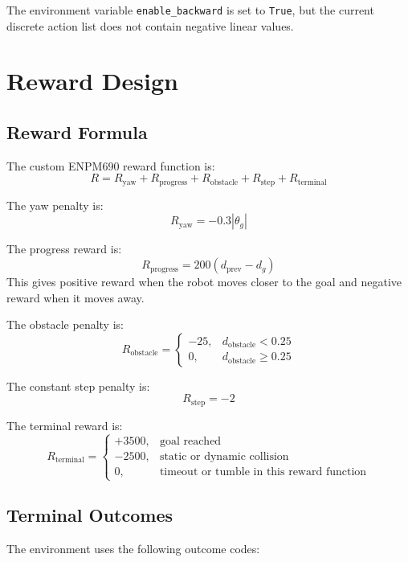 \documentclass[11pt,a4paper]{article}
\begin{document}
The environment variable \texttt{enable\_backward} is set to \texttt{True}, but the current discrete action list does not contain negative linear values.

\section{Reward Design}

\subsection{Reward Formula}

The custom ENPM690 reward function is:
\[
    R = R_{\text{yaw}} + R_{\text{progress}} + R_{\text{obstacle}} + R_{\text{step}} + R_{\text{terminal}}
\]

The yaw penalty is:
\[
    R_{\text{yaw}} = -0.3|\theta_g|
\]

The progress reward is:
\[
    R_{\text{progress}} = 200(d_{\text{prev}} - d_g)
\]
This gives positive reward when the robot moves closer to the goal and negative reward when it moves away.

The obstacle penalty is:
\[
    R_{\text{obstacle}} =
    \begin{cases}
    -25, & d_{\text{obstacle}} < 0.25 \\
    0, & d_{\text{obstacle}} \geq 0.25
    \end{cases}
\]

The constant step penalty is:
\[
    R_{\text{step}} = -2
\]

The terminal reward is:
\[
    R_{\text{terminal}} =
    \begin{cases}
    +3500, & \text{goal reached} \\
    -2500, & \text{static or dynamic collision} \\
    0, & \text{timeout or tumble in this reward function}
    \end{cases}
\]

\subsection{Terminal Outcomes}

The environment uses the following outcome codes:
\end{document}
